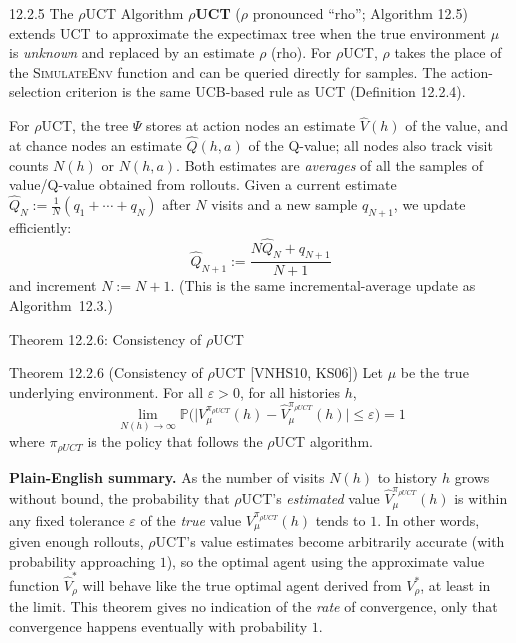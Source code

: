 \documentclass[aspectratio=169,10pt]{beamer}
\newcommand{\PP}{\mathbb{P}}
\begin{document}
\begin{frame}{12.2.5 The $\rho$UCT Algorithm}
\textbf{$\rho$UCT} ($\rho$ pronounced ``rho''; Algorithm 12.5) extends UCT to approximate
the expectimax tree when the true environment $\mu$ is \emph{unknown} and replaced by an
estimate $\rho$ (rho). For $\rho$UCT, $\rho$ takes the place of the \textsc{SimulateEnv}
function and can be queried directly for samples. The action-selection criterion is the
same UCB-based rule as UCT (Definition 12.2.4).

For $\rho$UCT, the tree $\Psi$ stores at action nodes an estimate $\widehat V(h)$ of the
value, and at chance nodes an estimate $\widehat Q(h,a)$ of the Q-value; all nodes also
track visit counts $N(h)$ or $N(h,a)$. Both estimates are \emph{averages} of all the
samples of value/Q-value obtained from rollouts. Given a current estimate
$\widehat Q_N:=\frac1N(q_1+\cdots+q_N)$ after $N$ visits and a new sample $q_{N+1}$, we
update efficiently:
$$\widehat Q_{N+1} := \frac{N\widehat Q_N + q_{N+1}}{N+1}$$
and increment $N:=N+1$. (This is the same incremental-average update as
Algorithm~12.3.)
\end{frame}

\begin{frame}{Theorem 12.2.6: Consistency of $\rho$UCT}
\begin{block}{Theorem 12.2.6 (Consistency of $\rho$UCT [VNHS10, KS06])}
Let $\mu$ be the true underlying environment. For all $\varepsilon>0$, for all histories
$h$,
$$\lim_{N(h)\to\infty}\PP\Big(\big|V_\mu^{\pi_{\rho UCT}}(h) -
\widehat V_\mu^{\pi_{\rho UCT}}(h)\big|\le\varepsilon\Big) = 1$$
where $\pi_{\rho UCT}$ is the policy that follows the $\rho$UCT algorithm.
\end{block}
\textbf{Plain-English summary.} As the number of visits $N(h)$ to history $h$ grows
without bound, the probability that $\rho$UCT's \emph{estimated} value
$\widehat V_\mu^{\pi_{\rho UCT}}(h)$ is within any fixed tolerance $\varepsilon$ of the
\emph{true} value $V_\mu^{\pi_{\rho UCT}}(h)$ tends to $1$. In other words, given enough
rollouts, $\rho$UCT's value estimates become arbitrarily accurate (with probability
approaching $1$), so the optimal agent using the approximate value function
$\widehat V_\rho^*$ will behave like the true optimal agent derived from $V_\rho^*$, at
least in the limit. This theorem gives no indication of the \emph{rate} of convergence,
only that convergence happens eventually with probability $1$.
\end{frame}
\end{document}
